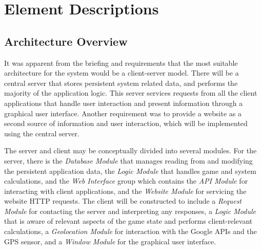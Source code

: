 \def\TabS#1#2{\small\tabular{#1}\rule[-1.5mm]{0pt}{5mm}{#2}
    \rule[-2mm]{0pt}{2mm}\endtabular\hspace{-1mm}}
\def\TabM#1#2{\tabular{#1}\rule[-1.5mm]{0pt}{7mm}{#2}
    \rule[-3mm]{0pt}{4mm}\endtabular\hspace{-1mm}}
\def\TabA#1#2#3{\small\tabular{#1}\rule[-1.5mm]{0pt}{5mm}\textbf{#2}\\
    \hline\rule[0mm]{0pt}{4mm}#3
    \rule[-2mm]{0pt}{2mm}\endtabular}
\def\TabB#1#2#3{\small\tabular{c}\rule[-1.5mm]{0pt}{5mm}
    \textbf{{\tiny$\ll$}#1{\tiny$\gg$}}\\
    \hline\rule[0mm]{0pt}{4mm}\tabular{ll}#2\endtabular \\
    \hline\rule[0mm]{0pt}{4mm}\tabular{ll}#3\endtabular
    \rule[-2mm]{0pt}{2mm}\endtabular}

\setcounter{section}{2}
\section{Element Descriptions}
\setcounter{subsection}{-1}
\subsection{Architecture Overview}
It was apparent from the briefing and requirements that the most suitable architecture for the system would be a client-server model. There will be a central server that stores persistent system related data, and performs the majority of the application logic. This server services requests from all the client applications that handle user interaction and present information through a graphical user interface. Another requirement was to provide a website as a second source of information and user interaction, which will be implemented using the central server.

The server and client may be conceptually divided into several modules. For the server, there is the \emph{Database Module} that manages reading from and modifying the persistent application data, the \emph{Logic Module} that handles game and system calculations, and the \emph{Web Interface} group which contains the \emph{API Module} for interacting with client applications, and the \emph{Website Module} for servicing the website HTTP requests. The client will be constructed to include a \emph{Request Module} for contacting the server and interpreting any responses, a \emph{Logic Module} that is aware of relevant aspects of the game state and performs client-relevant calculations, a \emph{Geolocation Module} for interaction with the Google APIs and the GPS sensor, and a \emph{Window Module} for the graphical user interface.

